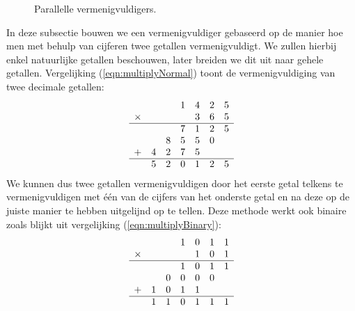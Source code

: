 \begin{figure}[htb]
{}
\caption{Parallelle vermenigvuldigers.}
\label{fig:parallelMultipliers}
\end{figure}
In deze subsectie bouwen we een vermenigvuldiger gebaseerd op de manier hoe men met behulp van cijferen twee getallen vermenigvuldigt. We zullen hierbij enkel natuurlijke getallen beschouwen, later breiden we dit uit naar gehele getallen. Vergelijking (\ref{eqn:multiplyNormal}) toont de vermenigvuldiging van twee decimale getallen:
\begin{equation}
\begin{array}{lcccccc}
&&&1&4&2&5\\
\times&&&&3&6&5\\\hline
&&&7&1&2&5\\
&&8&5&5&0&\\
+&4&2&7&5&&\\\hline
&5&2&0&1&2&5
\end{array}
\label{eqn:multiplyNormal}
\end{equation}
We kunnen dus twee getallen vermenigvuldigen door het eerste getal telkens te vermenigvuldigen met \'e\'en van de cijfers van het onderste getal en na deze op de juiste manier te hebben uitgelijnd op te tellen. Deze methode werkt ook binaire zoals blijkt uit vergelijking (\ref{eqn:multiplyBinary}):
\begin{equation}
\begin{array}{lcccccc}
&&&1&0&1&1\\
\times&&&&1&0&1\\\hline
&&&1&0&1&1\\
&&0&0&0&0&\\
+&1&0&1&1&&\\\hline
&1&1&0&1&1&1
\end{array}
\label{eqn:multiplyBinary}
\end{equation}
